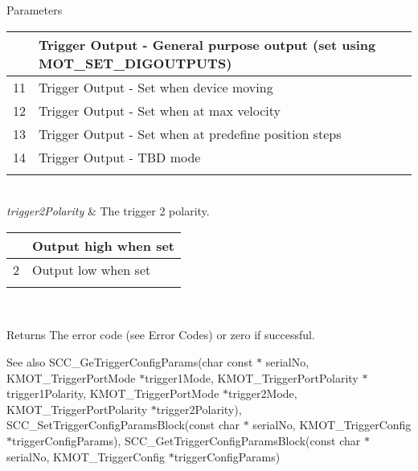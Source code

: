 \begin{DoxyParams}{Parameters}
\begin{tabularx}{\linewidth}{|*{2}{>{\raggedright\arraybackslash}X|}}
10&Trigger Output -\/ General purpose output (set using M\+O\+T\+\_\+\+S\+E\+T\+\_\+\+D\+I\+G\+O\+U\+T\+P\+U\+TS) \\\cline{1-2}
11&Trigger Output -\/ Set when device moving \\\cline{1-2}
12&Trigger Output -\/ Set when at max velocity \\\cline{1-2}
13&Trigger Output -\/ Set when at predefine position steps \\\cline{1-2}
14&Trigger Output -\/ T\+BD mode \\\cline{1-2}
\end{tabularx}
\\
\hline
{\em trigger2\+Polarity} & The trigger 2 polarity.\begin{tabularx}{\linewidth}{|*{2}{>{\raggedright\arraybackslash}X|}}\hline
1&Output high when set \\\cline{1-2}
2&Output low when set \\\cline{1-2}
\end{tabularx}
\\
\hline
\end{DoxyParams}
\begin{DoxyReturn}{Returns}
The error code (see Error Codes) or zero if successful. 
\end{DoxyReturn}
\begin{DoxySeeAlso}{See also}
S\+C\+C\+\_\+\+Ge\+Trigger\+Config\+Params(char const $\ast$ serial\+No, K\+M\+O\+T\+\_\+\+Trigger\+Port\+Mode $\ast$trigger1\+Mode, K\+M\+O\+T\+\_\+\+Trigger\+Port\+Polarity $\ast$trigger1\+Polarity, K\+M\+O\+T\+\_\+\+Trigger\+Port\+Mode $\ast$trigger2\+Mode, K\+M\+O\+T\+\_\+\+Trigger\+Port\+Polarity $\ast$trigger2\+Polarity), S\+C\+C\+\_\+\+Set\+Trigger\+Config\+Params\+Block(const char $\ast$ serial\+No, K\+M\+O\+T\+\_\+\+Trigger\+Config $\ast$trigger\+Config\+Params), S\+C\+C\+\_\+\+Get\+Trigger\+Config\+Params\+Block(const char $\ast$ serial\+No, K\+M\+O\+T\+\_\+\+Trigger\+Config $\ast$trigger\+Config\+Params)


\end{DoxySeeAlso}
